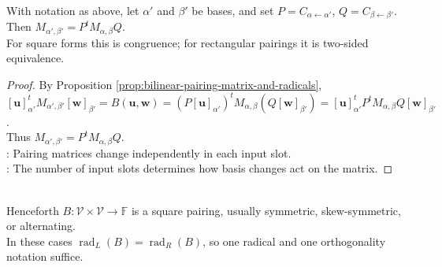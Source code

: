 \begin{proposition} \label{prop:bilinear-pairing-change-of-bases} \\
With notation as above, let $\alpha'$ and $\beta'$ be bases, and set $P=C_{\alpha\leftarrow\alpha'}$, $Q=C_{\beta\leftarrow\beta'}$. Then $M_{\alpha',\beta'}=P^tM_{\alpha,\beta}Q$.\\
For square forms this is congruence; for rectangular pairings it is two-sided equivalence.
\begin{proof}
By Proposition \ref{prop:bilinear-pairing-matrix-and-radicals}, $[\mathbf{u}]_{\alpha'}^tM_{\alpha',\beta'}[\mathbf{w}]_{\beta'} =B(\mathbf{u},\mathbf{w}) =(P[\mathbf{u}]_{\alpha'})^tM_{\alpha,\beta}(Q[\mathbf{w}]_{\beta'}) =[\mathbf{u}]_{\alpha'}^tP^tM_{\alpha,\beta}Q[\mathbf{w}]_{\beta'}$.\\
Thus $M_{\alpha',\beta'}=P^tM_{\alpha,\beta}Q$.\\
: Pairing matrices change independently in each input slot.\\
: The number of input slots determines how basis changes act on the matrix.
\end{proof}
\end{proposition}

\begin{perspective} \label{per:metric-spaces-specialize-bilinear-pairings} \\
Henceforth $B:\mathcal{V}\times\mathcal{V}\to\mathbb{F}$ is a square pairing, usually symmetric, skew-symmetric, or alternating.\\
In these cases $\operatorname{rad}_L(B)=\operatorname{rad}_R(B)$, so one radical and one orthogonality notation suffice.
\end{perspective}


